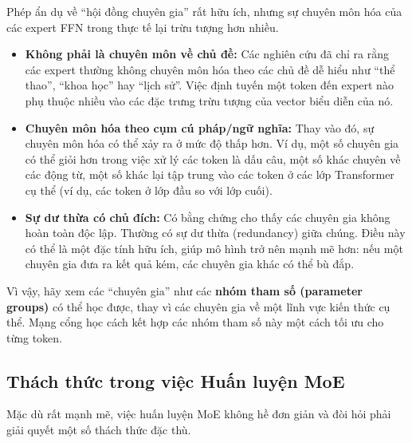 \begin{tcolorbox}[
    title={Các “Chuyên gia” có thực sự chuyên môn hóa không?},
    colback=blue!5!white, colframe=blue!75!black, fonttitle=\bfseries
]
Phép ẩn dụ về “hội đồng chuyên gia” rất hữu ích, nhưng sự chuyên môn hóa của các expert FFN trong thực tế lại trừu tượng hơn nhiều.
\begin{itemize}
    \item \textbf{Không phải là chuyên môn về chủ đề:} Các nghiên cứu đã chỉ ra rằng các expert thường không chuyên môn hóa theo các chủ đề dễ hiểu như “thể thao”, “khoa học” hay “lịch sử”. Việc định tuyến một token đến expert nào phụ thuộc nhiều vào các đặc trưng trừu tượng của vector biểu diễn của nó.
    \item \textbf{Chuyên môn hóa theo cụm cú pháp/ngữ nghĩa:} Thay vào đó, sự chuyên môn hóa có thể xảy ra ở mức độ thấp hơn. Ví dụ, một số chuyên gia có thể giỏi hơn trong việc xử lý các token là dấu câu, một số khác chuyên về các động từ, một số khác lại tập trung vào các token ở các lớp Transformer cụ thể (ví dụ, các token ở lớp đầu so với lớp cuối).
    \item \textbf{Sự dư thừa có chủ đích:} Có bằng chứng cho thấy các chuyên gia không hoàn toàn độc lập. Thường có sự dư thừa (redundancy) giữa chúng. Điều này có thể là một đặc tính hữu ích, giúp mô hình trở nên mạnh mẽ hơn: nếu một chuyên gia đưa ra kết quả kém, các chuyên gia khác có thể bù đắp.
\end{itemize}
Vì vậy, hãy xem các “chuyên gia” như các \textbf{nhóm tham số (parameter groups)} có thể học được, thay vì các chuyên gia về một lĩnh vực kiến thức cụ thể. Mạng cổng học cách kết hợp các nhóm tham số này một cách tối ưu cho từng token.
\end{tcolorbox}
\subsection{Thách thức trong việc Huấn luyện MoE}
\label{ssec:moe_training_challenges}

Mặc dù rất mạnh mẽ, việc huấn luyện MoE không hề đơn giản và đòi hỏi phải giải quyết một số thách thức đặc thù.

